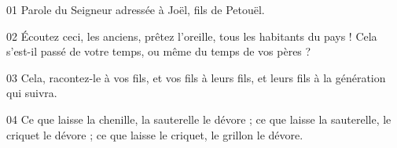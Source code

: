 01 Parole du Seigneur adressée à Joël, fils de Petouël.

02 Écoutez ceci, les anciens, prêtez l’oreille, tous les habitants du pays ! Cela s’est-il passé de votre temps, ou même du temps de vos pères ?

03 Cela, racontez-le à vos fils, et vos fils à leurs fils, et leurs fils à la génération qui suivra.

04 Ce que laisse la chenille, la sauterelle le dévore ; ce que laisse la sauterelle, le criquet le dévore ; ce que laisse le criquet, le grillon le dévore.
